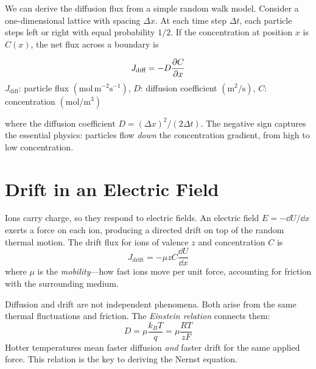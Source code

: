 We can derive the diffusion flux from a simple random walk model. Consider a one-dimensional lattice with spacing $\Delta x$. At each time step $\Delta t$, each particle steps left or right with equal probability $1/2$. If the concentration at position $x$ is $C(x)$, the net flux across a boundary is

\begin{keyequation}
\begin{equation}
  J_{\text{diff}} = -D \frac{\partial C}{\partial x}
  \label{eq:fick}
\end{equation}
\tcblower
$J_{\text{diff}}$: particle flux $(\text{mol}\,\text{m}^{-2}\text{s}^{-1})$, \quad
$D$: diffusion coefficient $(\text{m}^2/\text{s})$, \quad
$C$: concentration $(\text{mol}/\text{m}^3)$
\end{keyequation}

\noindent where the diffusion coefficient $D = (\Delta x)^2 / (2\Delta t)$. The negative sign captures the essential physics: particles flow \emph{down} the concentration gradient, from high to low concentration.


\section{Drift in an Electric Field}
\label{sec:drift}

Ions carry charge, so they respond to electric fields. An electric field $E = -\dd U / \dd x$ exerts a force on each ion, producing a directed drift on top of the random thermal motion. The drift flux for ions of valence $z$ and concentration $C$ is
%
\begin{equation}
  J_{\text{drift}} = -\mu z C \frac{\dd U}{\dd x}
  \label{eq:drift}
\end{equation}
%
where $\mu$ is the \emph{mobility}---how fast ions move per unit force, accounting for friction with the surrounding medium.

Diffusion and drift are not independent phenomena. Both arise from the same thermal fluctuations and friction. The \emph{Einstein relation} connects them:
%
\begin{equation}
  D = \mu \frac{k_B T}{q} = \mu \frac{RT}{zF}
  \label{eq:einstein}
\end{equation}
%
Hotter temperatures mean faster diffusion \emph{and} faster drift for the same applied force. This relation is the key to deriving the Nernst equation.

